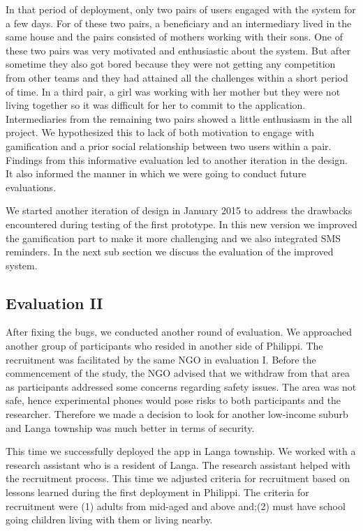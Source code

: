 \documentclass{sig-alternate}
\begin{document}
In that period of deployment, only two pairs of users engaged with the system
for a few days. For of these two pairs, a beneficiary and an  intermediary
lived in the same house and the pairs consisted of mothers working with their
sons. One of these two pairs was very motivated and enthusiastic about the
system. But after sometime they also got bored because they were not getting
any competition from other teams and they had attained all the challenges
within a short period of time. In a third pair, a girl was working with her
mother but they were not living together so it was difficult for her to commit
to the application. Intermediaries from the remaining two pairs showed a
little enthusiasm in the all project. We hypothesized this to lack of both
motivation to engage with gamification and a prior social relationship between
two users within a pair. Findings from this informative evaluation led to
another iteration in the design. It also informed the manner in which we were
going to conduct future evaluations.

We started another iteration of design in January 2015 to address the
drawbacks encountered during testing of the first prototype. In this new
version we improved the gamification part to make it more challenging and we
also integrated SMS reminders. In the next sub section we discuss the
evaluation of the improved system.
 
\subsection{Evaluation II}

After fixing the bugs, we conducted another round of evaluation. We approached
another group of participants who resided in another side of Philippi. The
recruitment was facilitated by the same NGO in evaluation I. Before the
commencement of the study, the NGO advised that we withdraw from that area as
participants addressed some concerns regarding safety issues. The area was not
safe, hence experimental phones would pose risks to both participants and the
researcher. Therefore we made a decision to look for another low-income suburb
and Langa township was much better in terms of security.

This time we successfully deployed the app in Langa township. We worked with a
research assistant who is a resident of Langa. The research assistant helped
with the recruitment process. This time we adjusted criteria for recruitment
based on lessons learned during the first deployment in Philippi. The criteria
for recruitment were (1) adults from mid-aged and above and;(2) must have
school going children living with them or living nearby.
\end{document}
